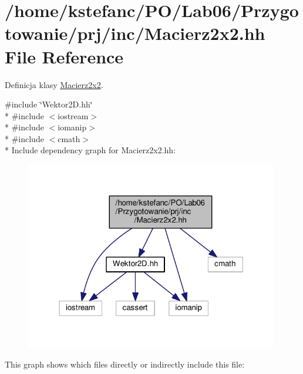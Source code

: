 \hypertarget{_macierz2x2_8hh}{\section{/home/kstefanc/\+P\+O/\+Lab06/\+Przygotowanie/prj/inc/\+Macierz2x2.hh File Reference}
\label{_macierz2x2_8hh}
}


Definicja klasy \hyperlink{class_macierz2x2}{Macierz2x2}.  


{\ttfamily \#include \char`\"{}Wektor2\+D.\+hh\char`\"{}}\\*
{\ttfamily \#include $<$iostream$>$}\\*
{\ttfamily \#include $<$iomanip$>$}\\*
{\ttfamily \#include $<$cmath$>$}\\*
Include dependency graph for Macierz2x2.\+hh\+:\nopagebreak
\begin{figure}[H]
\begin{center}
\leavevmode
\includegraphics[width=314pt]{_macierz2x2_8hh__incl}
\end{center}
\end{figure}
This graph shows which files directly or indirectly include this file\+:
\nopagebreak
